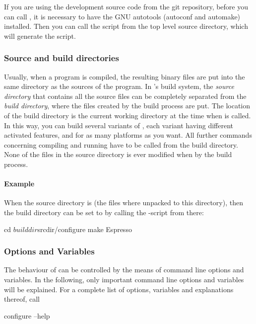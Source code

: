 If you are using the development source code from the \textsf{git}
repository, before you can call , it is necessary
to have the GNU autotools (\textsf{autoconf} and \textsf{automake})
installed.  Then you can call the script  from
the top level source directory, which will generate the
 script.

\subsubsection{Source and build directories}
\label{ssec:builddir}
 

Usually, when a program is compiled, the resulting binary files are
put into the same directory as the sources of the program.  In \es's
build system, the \emph{source directory} that contains all the source
files can be completely separated from the \emph{build directory},
where the files created by the build process are put.  The location of
the build directory is the current working directory at the time when
 is called.  In this way, you can build several
variants of \es, each variant having different activated features, and
for as many platforms as you want.  All further commands concerning
compiling and running \es have to be called from the build directory.
None of the files in the source directory is ever modified when by the
build process.

\paragraph{Example}
When the source directory is  (\ie the files where
unpacked to this directory), then the build directory can be set to
 by calling the -script from
there:
\begin{code}
cd $builddir
$srcdir/configure
make
Espresso
\end{code}

\subsubsection{Options and Variables}
\label{ssec:configureoptions}

 The behaviour of  can be
controlled by the means of command line options and variables.  In the
following, only important command line options and variables \es will
be explained.  For a complete list of options, variables and
explanations thereof, call
\begin{code}
configure --help
\end{code}

